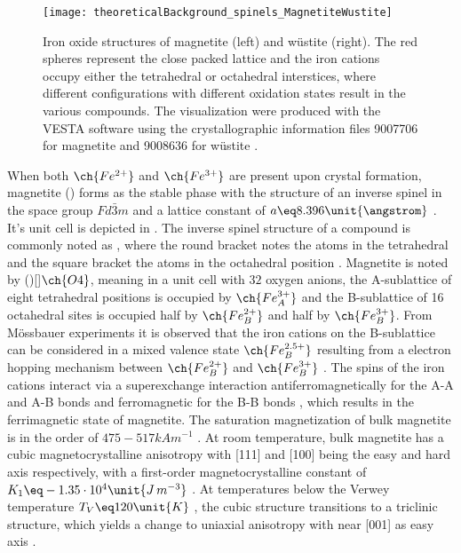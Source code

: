 \documentclass[\main/dresen_thesis.tex]{subfiles}
\begin{document}
  \begin{figure}[htbp]
    \centering
    \texttt{[image: theoreticalBackground\_spinels\_MagnetiteWustite]}
    \caption{\label{fig:theoreticalBackground:ferrites:ironOxides}Iron oxide structures of magnetite (left) and w\"ustite (right). The red spheres represent the close packed  lattice and the iron cations occupy either the tetrahedral or octahedral interstices, where different configurations with different oxidation states result in the various compounds. The visualization were produced with the VESTA software \cite{Momma_2011_Vesta} using the crystallographic information files 9007706 \cite{Fleet_1984_Thest} for magnetite and 9008636 for w\"ustite \cite{Wyckoff_1963_Secon}.}
  \end{figure}
  When both $\ch{Fe^{2+}}$ and $\ch{Fe^{3+}}$ are present upon crystal formation, magnetite () forms as the stable phase with the structure of an inverse spinel in the space group $Fd\bar{3}m$ and a lattice constant of $a \eq 8.396 \unit{\angstrom}$ \cite{Cornell_2003_Their}.
  It's unit cell is depicted in .
  The inverse spinel structure of a compound  is commonly noted as , where the round bracket notes the atoms in the tetrahedral and the square bracket the atoms in the octahedral position \cite{Sickafus_1999_Struc}.
  Magnetite is noted by ()[]$\ch{O4}$, meaning in a unit cell with $32$ oxygen anions, the A-sublattice of eight tetrahedral positions is occupied by $\ch{Fe^{3+}_A}$ and the B-sublattice of 16 octahedral sites is occupied half by $\ch{Fe^{2+}_B}$ and half by $\ch{Fe^{3+}_B}$.
  From M\"ossbauer experiments it is observed that the iron cations on the B-sublattice can be considered in a mixed valence state $\ch{Fe^{2.5+}_B}$ resulting from a electron hopping mechanism between $\ch{Fe^{2+}_B}$ and $\ch{Fe^{3+}_B}$ \cite{Cornell_2003_Their}.
  The spins of the iron cations interact via a superexchange interaction antiferromagnetically for the A-A and A-B bonds and ferromagnetic for the B-B bonds \cite{Mazozuluaga_2007_Surfa}, which results in the ferrimagnetic state of magnetite.
  The saturation magnetization of bulk magnetite is in the order of $475 - 517 \unit{kA m^{-1}}$ \cite{Cornell_2003_Their, Handley_2000_Moder}.
  At room temperature, bulk magnetite has a cubic magnetocrystalline anisotropy with [111] and [100] being the easy and hard axis respectively, with a first-order magnetocrystalline constant of $K_1 \eq -1.35 \cdot 10^{4} \unit{J\, m^{-3}}$ \cite{Goya_2003_Stati}.
  At temperatures below the Verwey temperature $T_V \eq 120 \unit{K}$ \cite{Bickford_1957_Magne}, the cubic structure transitions to a triclinic structure, which yields a change to uniaxial anisotropy with near [001] as easy axis \cite{Medrano_1999_Domai}.
\end{document}
